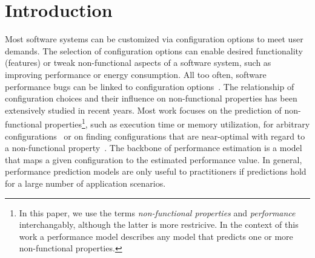 \section{Introduction}
Most software systems can be customized via configuration options to meet user demands. The selection of configuration options can enable desired functionality (features) or tweak non-functional aspects of a software system, such as improving performance or energy consumption. 
All too often, software performance bugs can be linked to configuration options~\cite{han_empirical_2016}. 
The relationship of configuration choices and their influence on non-functional properties has been extensively studied in recent years. Most work focuses on the prediction of non-functional properties\footnote{In this paper, we use the terms \textit{non-functional properties} and \textit{performance} interchangably, although the latter is more restricive. In the context of this work a performance model describes any model that predicts one or more non-functional properties.}, such as execution time or memory utilization, for arbitrary configurations~\cite{dorn2020,siegmundPerformanceinfluenceModelsHighly2015,haDeepPerf2019,perfAL,guoVariabilityawarePerformancePrediction2013,sarkarCostEfficientSamplingPerformance,guo_2018_data,fourier_learning_2015,perLasso} or on finding configurations that are near-optimal with regard to a non-functional property~\cite{nairUsingBadLearners2017,nairFlash18,ohFindingNearoptimalConfigurations2017}. 
The backbone of performance estimation is a model that maps a given configuration to the estimated performance value. 
In general, performance prediction models are only useful to practitioners if predictions hold for a large number of application scenarios.

